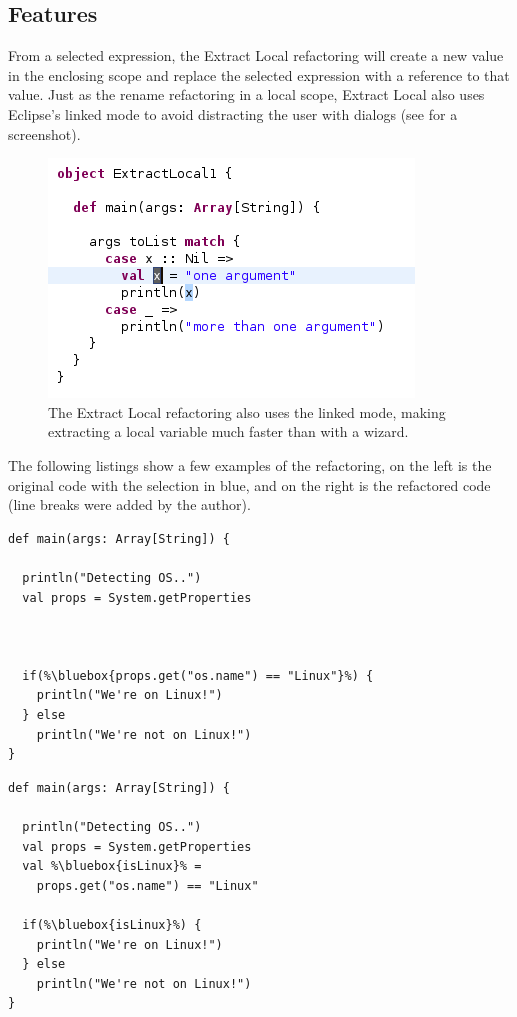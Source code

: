 \documentclass[10pt,a4paper,oneside]{scrreprt}
\begin{document}
\subsection{Features}

From a selected expression, the Extract Local refactoring will create a new value in the enclosing scope and replace the selected expression with a reference to that value. Just as the rename refactoring in a local scope, Extract Local also uses Eclipse's linked mode to avoid distracting the user with dialogs (see  for a screenshot).

\begin{figure}
  \centering
  \includegraphics[width=0.55\linewidth]{extract_local_screenshot_1.png}
  \caption{The Extract Local refactoring also uses the linked mode, making extracting a local variable much faster than with a wizard.}
  \label{figure:extract-local-screenshot-1}
\end{figure}


The following listings show a few examples of the refactoring, on the left is the original code with the selection in blue, and on the right is the refactored code (line breaks were added by the author).

\begin{multicols}{2}
\begin{lstlisting}
def main(args: Array[String]) {

  println("Detecting OS..")
  val props = System.getProperties
  


  if(%\bluebox{props.get("os.name") == "Linux"}%) {
    println("We're on Linux!")
  } else
    println("We're not on Linux!")
}
\end{lstlisting}
\begin{lstlisting}
def main(args: Array[String]) {

  println("Detecting OS..")
  val props = System.getProperties
  val %\bluebox{isLinux}% = 
    props.get("os.name") == "Linux"
  
  if(%\bluebox{isLinux}%) {
    println("We're on Linux!")
  } else
    println("We're not on Linux!")
}
\end{lstlisting}
\end{multicols}
\end{document}
